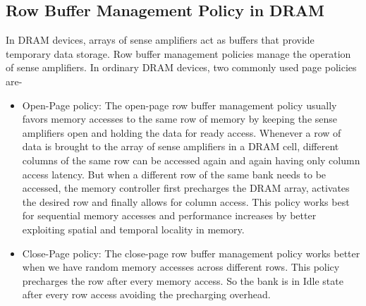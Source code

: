 
\subsection{Row Buffer Management Policy in DRAM}\label{b3}
\noindent
In DRAM devices, arrays of sense amplifiers act as buffers that provide temporary data storage. Row buffer management policies 
manage the operation of sense amplifiers. In ordinary DRAM devices, two commonly used page policies are-

\begin{itemize}
\item Open-Page policy: The open-page row buffer management policy usually favors memory accesses to the same row of memory by 
keeping the sense amplifiers open and holding the data for ready access. Whenever a row of data is brought to the array of 
sense amplifiers in a DRAM cell, different columns of the same row can be accessed again and again having only column access 
latency. But when a different row of the same bank needs to be accessed, the memory controller first precharges the DRAM 
array, activates the desired row and finally allows for column access. This policy works best for sequential memory accesses 
and performance increases by better exploiting spatial and temporal locality in memory.

\item Close-Page policy: The close-page row buffer management policy works better when we have random memory accesses across
different rows. This policy precharges the row after every memory access. So the bank is in Idle state after every 
row access avoiding the precharging overhead.  
\end{itemize}

